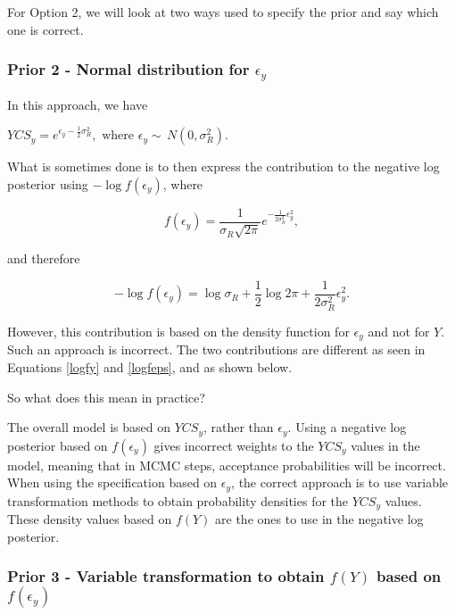 \begin{appendices}
For Option 2, we will look at two ways used to specify the prior and say
which one is correct.

\subsubsection*{\texorpdfstring{Prior 2 - Normal distribution for
		\(\epsilon_y\)}{2.2.1 Prior 2 - Normal distribution for \textbackslash{}epsilon\_y}}\label{prior-2---normal-distribution-for-epsilon_y}

In this approach, we have

\(YCS_y = e^{\epsilon_y - \frac{1}{2}\sigma^2_R},\,\, \text{where } \epsilon_y \sim \,N(0, \sigma^2_R)\).

What is sometimes done is to then express the contribution to the negative log posterior using \(-\log f(\epsilon_y)\), where

\[f(\epsilon_y) = \frac{1}{\sigma_R\sqrt{2\pi}}e^{-\frac{1}{2\sigma_R^2}\epsilon_y^2},\]

and therefore

\begin{equation}
-\log f(\epsilon_y)= \log \sigma_R + \frac{1}{2}\log 2\pi + \frac{1}{2\sigma_R^2}\epsilon_y^2.
\label{logfeps}
\end{equation}

However, this contribution is based on the density function for \(\epsilon_y\) and not for \(Y\). Such an approach is incorrect. The two contributions are different as seen in Equations \ref{logfy} and \ref{logfeps}, and as shown below.

So what does this mean in practice?

The overall model is based on \(YCS_y\), rather than \(\epsilon_y\). Using a negative log posterior based on \(f(\epsilon_y)\) gives incorrect weights to the \(YCS_y\) values in the model, meaning that in MCMC steps, acceptance probabilities will be incorrect. When using the specification based on \(\epsilon_y\), the correct approach is to use variable transformation methods to obtain probability densities for the \(YCS_y\) values. These density values based on \(f(Y)\) are the ones to use in the negative log posterior.

\subsubsection*{\texorpdfstring{Prior 3 - Variable transformation
		to obtain \(f(Y)\) based on
		\(f(\epsilon_y)\)}{Prior 3 - Variable transformation to obtain f(Y) based on f(\textbackslash{}epsilon\_y)}}\label{prior-3---variable-transformation-to-obtain-fy-based-on-fepsilon_y}


\end{appendices}
